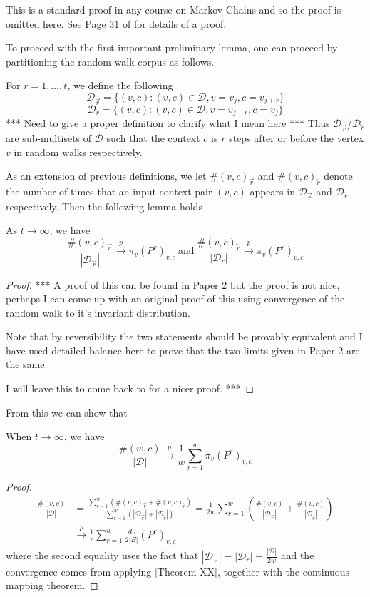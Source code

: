 \documentclass[a4paper]{article}
\newcommand{\D}{\mathcal D}
\newcommand{\rar}{\overrightarrow r}
\newcommand{\lar}{\overleftarrow r}
\begin{document}
This is a standard proof in any course on Markov Chains and so the proof is
omitted here. See Page 31 of \cite{markov_chains} for details of a proof.

To proceed with the first important preliminary lemma, one can proceed by
partitioning the random-walk corpus as follows.

\begin{definition}
  For $r = 1, \dots, t$, we define the following
  \[\D_{\rar} = \{ (v, c) : (v, c) \in \D, v = v_j, c = v_{j+r}\}\]
  \[\D_{\lar} = \{ (v, c) : (v, c) \in \D, v = v_{j+r}, c = v_{j}\}\]
  *** Need to give a proper definition to clarify what I mean here ***
  Thus $\D_{\rar}$/$\D_{\lar}$ are sub-multisets of $\D$ such that the context
  $c$ is $r$ steps after or before the vertex $v$ in random walks respectively.
\end{definition}

As an extension of previous definitions, we let $\#(v, c)_{\rar}$ and $\#(v,
c)_{\lar}$ denote the number of times that an input-context pair $(v,c)$ appears
in $\D_{\rar}$ and $\D_{\lar}$ respectively. Then the following lemma holds
\begin{lemma}
  As $t \to \infty$, we have
  \[\frac{\#(v, c)_{\rar}}{|\D_{\rar}|} \overset{p}{\to} \pi_v(P^r)_{v,c} \  \text{and}
    \ \frac{\#(v, c)_{\lar}}{|\D_{\lar}|} \overset{p}{\to} \pi_v(P^r)_{v,c} \]
\end{lemma}
\begin{proof}
***
A proof of this can be found in Paper 2 but the proof is not nice, perhaps I can
come up with an original proof of this using convergence of the random walk to
it's invariant distribution.

Note that by reversibility the two statements should be provably equivalent and
I have used detailed balance here to prove that the two limits given in Paper 2
are the same.

I will leave this to come back to for a nicer proof.
***
\end{proof}

From this we can show that

\begin{lemma}
  When $t \to \infty$, we have
  \[\frac{\#(w, c)}{|\D|} \overset{p}{\to} \frac{1}{w} \sum_{r = 1}^w \pi_v
    (P^r)_{v,c}\]
\end{lemma}
\begin{proof}
  \begin{align}
    \frac{\#(v, c)}{|\D|} &=  \frac{\sum_{r=1}^w (\#(v, c)_{\rar} + \#(v, c)_{\lar})}{\sum_{r=1}^w (|\D_{\rar}| + |\D_{\lar}|)} = \frac{1}{2w} \sum_{r=1}^w \left( \frac{\#(v, c)}{|\D_{\rar}|} + \frac{\#(v, c)}{|\D_{\lar}|} \right)\\
    &\overset{p}{\to} \frac{1}{r}\sum_{r=1}^{w} \frac{d_v}{2|E|}(P^r)_{v, c}
  \end{align}
  where the second equality uses the fact that $|\D_{\rar}| = |\D_{\lar}| =
  \frac{|\D|}{2w}$ and the convergence comes from applying [Theorem XX],
  together with the continuous mapping theorem.
\end{proof}
\end{document}
